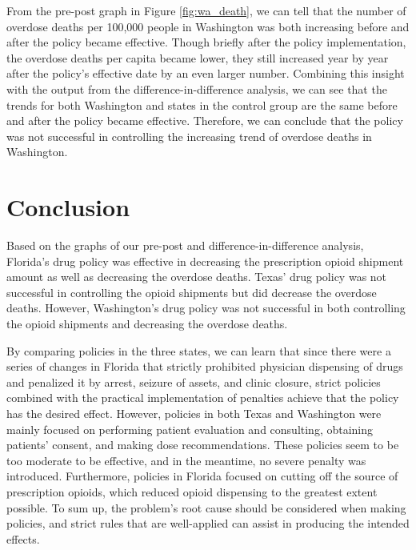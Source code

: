 \documentclass[12pt,letterpaper]{article}
\begin{document}
From the pre-post graph in Figure \ref{fig:wa_death}, we can tell that the number of overdose deaths per 100,000 people in Washington was both increasing before and after the policy became effective. Though briefly after the policy implementation, the overdose deaths per capita became lower, they still increased year by year after the policy's effective date by an even larger number. Combining this insight with the output from the difference-in-difference analysis, we can see that the trends for both Washington and states in the control group are the same before and after the policy became effective. Therefore, we can conclude that the policy was not successful in controlling the increasing trend of overdose deaths in Washington.


\section{Conclusion}

Based on the graphs of our pre-post and difference-in-difference analysis, Florida's drug policy was effective in decreasing the prescription opioid shipment amount as well as decreasing the overdose deaths. Texas' drug policy was not successful in controlling the opioid shipments but did decrease the overdose deaths. However, Washington's drug policy was not successful in both controlling the opioid shipments and decreasing the overdose deaths.

By comparing policies in the three states, we can learn that since there were a series of changes in Florida that strictly prohibited physician dispensing of drugs and penalized it by arrest, seizure of assets, and clinic closure, strict policies combined with the practical implementation of penalties achieve that the policy has the desired effect. However, policies in both Texas and Washington were mainly focused on performing patient evaluation and consulting, obtaining patients' consent, and making dose recommendations. These policies seem to be too moderate to be effective, and in the meantime, no severe penalty was introduced. Furthermore, policies in Florida focused on cutting off the source of prescription opioids, which reduced opioid dispensing to the greatest extent possible. To sum up, the problem's root cause should be considered when making policies, and strict rules that are well-applied can assist in producing the intended effects.
\end{document}
